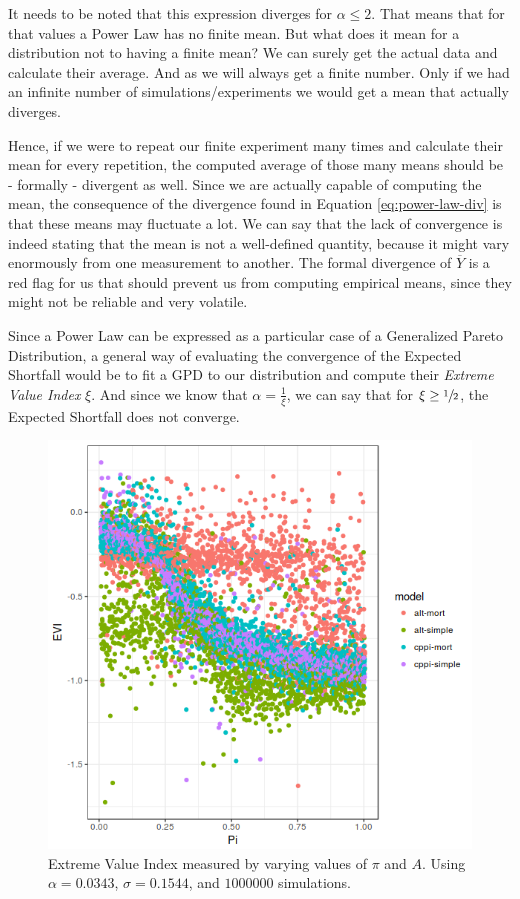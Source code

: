It needs to be noted that this expression diverges for $\alpha \leq 2$. That means that for that values a Power Law has no finite mean. But what does it mean for a distribution not to having a finite mean? We can surely get the actual data and calculate their average. And as we will always get a finite number. Only if we had an infinite number of simulations/experiments we would get a mean that actually diverges.

Hence, if we were to repeat our finite experiment many times and calculate their mean for every repetition, the computed average of those many means should be - formally - divergent as well. Since we are actually capable of computing the mean, the consequence of the divergence found in Equation \ref{eq:power-law-div} is that these means may fluctuate a lot. We can say that the lack of convergence is indeed stating that the mean is not a well-defined quantity, because it might vary enormously from one measurement to another. The formal divergence of $\overline{Y}$ is a red flag for us that should prevent us from computing empirical means, since they might not be reliable and very volatile.

Since a Power Law can be expressed as a particular case of a Generalized Pareto Distribution, a general way of evaluating the convergence of the Expected Shortfall would be to fit a GPD to our distribution and compute their \emph{Extreme Value Index} $\xi$. And since we know that $\alpha = \frac{1}{\xi}$, we can say that for $\xi \geq \sfrac{1}{2}$, the Expected Shortfall does not converge.

\begin{figure}[h]
    \centering
    \includegraphics[scale=0.75]{images/evi-pi_new.png}
    \caption{Extreme Value Index measured by varying values of $\pi$ and $A$.  Using $\alpha = 0.0343$, $\sigma = 0.1544$, and $1000000$ simulations.}
    \label{fig:evi-pi}
\end{figure}

